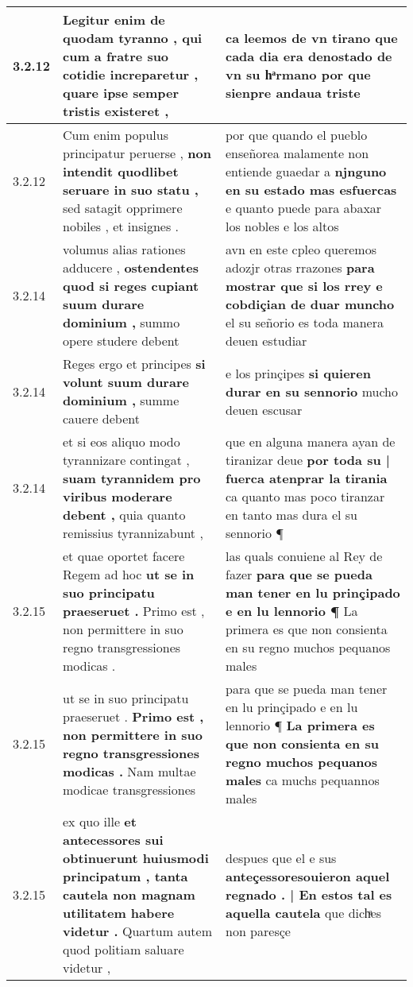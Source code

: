 \begin{tabular}{|p{1cm}|p{6.5cm}|p{6.5cm}|}
3.2.12 & Legitur enim de quodam tyranno , \textbf{ qui cum a fratre suo cotidie increparetur , } quare ipse semper tristis existeret , & ca leemos de vn tirano \textbf{ que cada dia era denostado de vn su hͣrmano } por que sienpre andaua triste \\\hline
3.2.12 & Cum enim populus principatur peruerse , \textbf{ non intendit quodlibet seruare in suo statu , } sed satagit opprimere nobiles , et insignes . & por que quando el pueblo enseñorea malamente non entiende guaedar a \textbf{ njnguno en su estado mas esfuercas } e quanto puede para abaxar los nobles e los altos \\\hline
3.2.14 & volumus alias rationes adducere , \textbf{ ostendentes quod si reges cupiant suum durare dominium , } summo opere studere debent & avn en este cpleo queremos adozjr otras rrazones \textbf{ para mostrar que si los rrey e cobdiçian de duar muncho } el su señorio es toda manera deuen estudiar \\\hline
3.2.14 & Reges ergo et principes \textbf{ si volunt suum durare dominium , } summe cauere debent & e los prinçipes \textbf{ si quieren durar en su sennorio } mucho deuen escusar \\\hline
3.2.14 & et si eos aliquo modo tyrannizare contingat , \textbf{ suam tyrannidem pro viribus moderare debent , } quia quanto remissius tyrannizabunt , & que en alguna manera ayan de tiranizar deue \textbf{ por toda su | fuerca atenprar la tirania } ca quanto mas poco tiranzar en tanto mas dura el su sennorio ¶ \\\hline
3.2.15 & et quae oportet facere Regem ad hoc \textbf{ ut se in suo principatu praeseruet . } Primo est , non permittere in suo regno transgressiones modicas . & las quals conuiene al Rey de fazer \textbf{ para que se pueda man tener en lu prinçipado e en lu lennorio ¶ } La primera es que non consienta en su regno muchos pequanos males \\\hline
3.2.15 & ut se in suo principatu praeseruet . \textbf{ Primo est , non permittere in suo regno transgressiones modicas . } Nam multae modicae transgressiones & para que se pueda man tener en lu prinçipado e en lu lennorio ¶ \textbf{ La primera es que non consienta en su regno muchos pequanos males } ca muchs pequannos males \\\hline
3.2.15 & ex quo ille \textbf{ et antecessores sui obtinuerunt huiusmodi principatum , tanta cautela non magnam utilitatem habere videtur . } Quartum autem quod politiam saluare videtur , & despues que el e sus \textbf{ anteçessoresouieron aquel regnado . | En estos tal es aquella cautela } que dichͣes non paresçe \\\hline

\end{tabular}
